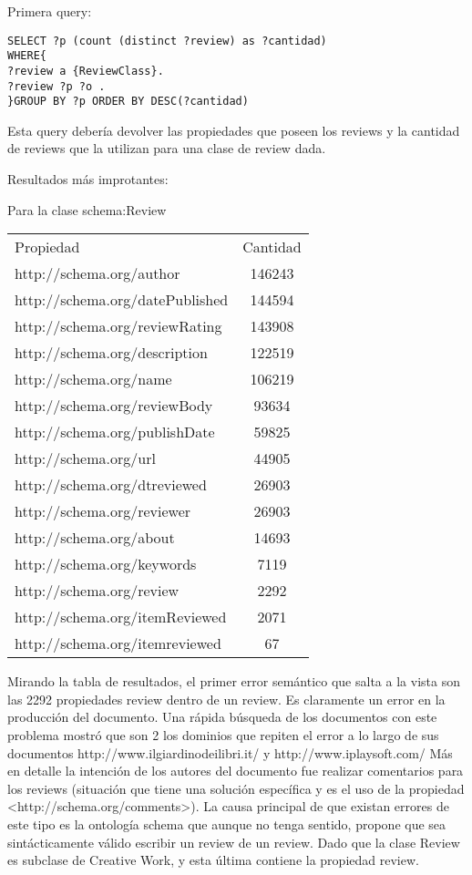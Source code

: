 Primera query:

\begin{lstlisting}[frame=single]
SELECT ?p (count (distinct ?review) as ?cantidad) 
WHERE{
?review a {ReviewClass}.
?review ?p ?o .
}GROUP BY ?p ORDER BY DESC(?cantidad)
\end{lstlisting}

Esta query debería devolver las propiedades que poseen los reviews y la cantidad de reviews que la utilizan para una clase de review dada.

Resultados más improtantes:

Para la clase schema:Review\\
\begin{tabular}{| l | c | }
 Propiedad & Cantidad \\
 http://schema.org/author & 146243 \\
 http://schema.org/datePublished & 144594 \\
 http://schema.org/reviewRating & 143908 \\
 http://schema.org/description & 122519 \\
 http://schema.org/name & 106219 \\
 http://schema.org/reviewBody & 93634 \\
 http://schema.org/publishDate & 59825 \\
 http://schema.org/url & 44905 \\
 http://schema.org/dtreviewed & 26903 \\
 http://schema.org/reviewer & 26903 \\
 http://schema.org/about & 14693 \\
 http://schema.org/keywords & 7119 \\
 http://schema.org/review & 2292 \\
 http://schema.org/itemReviewed & 2071 \\
 http://schema.org/itemreviewed & 67 
\end{tabular}

 Mirando la tabla de resultados, el primer error semántico que salta a la vista son las 2292 propiedades review dentro de un review. 
 Es claramente un error en la producción del documento. 
 Una rápida búsqueda de los documentos con este problema mostró que son 2 los dominios que repiten el error a lo largo de sus documentos
 http://www.ilgiardinodeilibri.it/ y http://www.iplaysoft.com/
 Más en detalle la intención de los autores del documento fue realizar comentarios para los reviews (situación que tiene una solución específica 
 y es el uso de la propiedad <http://schema.org/comments>). 
 La causa principal de que existan errores de este tipo es la ontología schema que aunque no tenga sentido, propone que sea sintácticamente válido
 escribir un review de un review. Dado que la clase Review es subclase de Creative Work, y esta última contiene la propiedad review.
 
